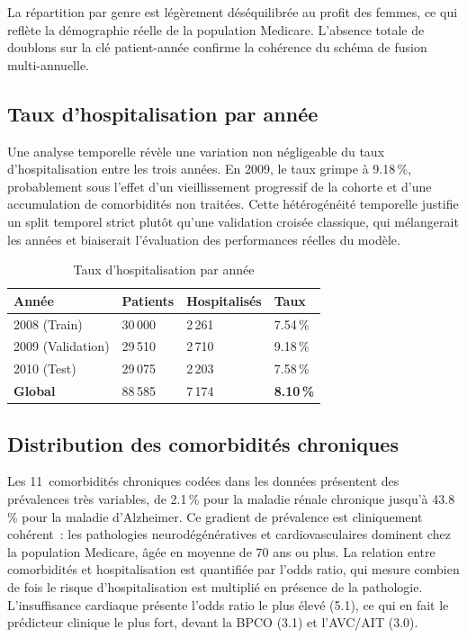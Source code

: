 La répartition par genre est légèrement déséquilibrée au profit des femmes, ce
qui reflète la démographie réelle de la population Medicare. L'absence totale de
doublons sur la clé patient-année confirme la cohérence du schéma de fusion
multi-annuelle.


\subsection{Taux d'hospitalisation par année}

Une analyse temporelle révèle une variation non négligeable du taux d'hospitalisation
entre les trois années. En 2009, le taux grimpe à 9.18\,\%, probablement sous l'effet
d'un vieillissement progressif de la cohorte et d'une accumulation de comorbidités
non traitées. Cette hétérogénéité temporelle justifie un split temporel strict plutôt
qu'une validation croisée classique, qui mélangerait les années et biaiserait
l'évaluation des performances réelles du modèle.

\begin{table}[htbp]
\centering
\caption{Taux d'hospitalisation par année}
\label{tab:hosp_annee}
\begin{tabular}{@{}llll@{}}
\toprule
\textbf{Année} & \textbf{Patients} & \textbf{Hospitalisés} & \textbf{Taux} \\
\midrule
2008 (Train)       & 30\,000 & 2\,261 & 7.54\,\% \\
2009 (Validation)  & 29\,510 & 2\,710 & 9.18\,\% \\
2010 (Test)        & 29\,075 & 2\,203 & 7.58\,\% \\
\midrule
\textbf{Global}    & 88\,585 & 7\,174 & \textbf{8.10\,\%} \\
\bottomrule
\end{tabular}
\end{table}

\subsection{Distribution des comorbidités chroniques}

Les 11~comorbidités chroniques codées dans les données présentent des prévalences
très variables, de 2.1\,\% pour la maladie rénale chronique jusqu'à 43.8\,\% pour
la maladie d'Alzheimer. Ce gradient de prévalence est cliniquement cohérent~: les
pathologies neurodégénératives et cardiovasculaires dominent chez la population
Medicare, âgée en moyenne de 70 ans ou plus. La relation entre comorbidités et
hospitalisation est quantifiée par l'odds ratio, qui mesure combien de fois le
risque d'hospitalisation est multiplié en présence de la pathologie. L'insuffisance
cardiaque présente l'odds ratio le plus élevé (5.1), ce qui en fait le prédicteur
clinique le plus fort, devant la BPCO (3.1) et l'AVC/AIT (3.0).

